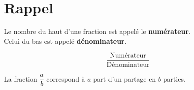 \section{Rappel}

{   \begin{minipage}{0.7\textwidth}
        Le nombre du haut d'une fraction est appelé le \textbf{numérateur}. 
        \\Celui du bas est appelé \textbf{dénominateur}.
    \end{minipage}
    \hfil
    \begin{minipage}{0.25\textwidth}
        $$\dfrac{\text{Numérateur}}{\text{Dénominateur}}$$
    \end{minipage}
}


{La fraction $\dfrac{a}{b}$ correspond à $a$ part d'un partage en $b$ parties. 
}
